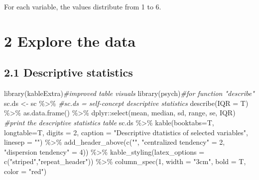 \documentclass[
]{article}
\newenvironment{Shaded}{\begin{snugshade}}{\end{snugshade}}
\newcommand{\AttributeTok}[1]{\textcolor[rgb]{0.77,0.63,0.00}{#1}}
\newcommand{\CommentTok}[1]{\textcolor[rgb]{0.56,0.35,0.01}{\textit{#1}}}
\newcommand{\DecValTok}[1]{\textcolor[rgb]{0.00,0.00,0.81}{#1}}
\newcommand{\FunctionTok}[1]{\textcolor[rgb]{0.00,0.00,0.00}{#1}}
\newcommand{\NormalTok}[1]{#1}
\newcommand{\OtherTok}[1]{\textcolor[rgb]{0.56,0.35,0.01}{#1}}
\newcommand{\SpecialCharTok}[1]{\textcolor[rgb]{0.00,0.00,0.00}{#1}}
\newcommand{\StringTok}[1]{\textcolor[rgb]{0.31,0.60,0.02}{#1}}
\begin{document}
For each variable, the values distribute from 1 to 6.

\hypertarget{explore-the-data}{%
\section{2 Explore the data}\label{explore-the-data}}

\hypertarget{descriptive-statistics}{%
\subsection{2.1 Descriptive statistics}\label{descriptive-statistics}}

\begin{Shaded}
\begin{Highlighting}[]
\FunctionTok{library}\NormalTok{(kableExtra)}\CommentTok{\#improved table visuals}
\FunctionTok{library}\NormalTok{(psych)}\CommentTok{\#for function "describe"}
\NormalTok{sc.ds }\OtherTok{\textless{}{-}}\NormalTok{ sc }\SpecialCharTok{\%\textgreater{}\%}  \CommentTok{\#sc.ds = self{-}concept descriptive statistics}
  \FunctionTok{describe}\NormalTok{(}\AttributeTok{IQR =}\NormalTok{ T) }\SpecialCharTok{\%\textgreater{}\%}
  \FunctionTok{as.data.frame}\NormalTok{() }\SpecialCharTok{\%\textgreater{}\%} 
\NormalTok{  dplyr}\SpecialCharTok{::}\FunctionTok{select}\NormalTok{(mean, median, sd, range, se, IQR)}
\CommentTok{\#print the descriptive statistics table}
\NormalTok{sc.ds }\SpecialCharTok{\%\textgreater{}\%} 
  \FunctionTok{kable}\NormalTok{(}\AttributeTok{booktabs=}\NormalTok{T,}
        \AttributeTok{longtable=}\NormalTok{T,}
        \AttributeTok{digits =} \DecValTok{2}\NormalTok{,}
        \AttributeTok{caption =} \StringTok{"Descriptive dtatistics of selected variables"}\NormalTok{,}
        \AttributeTok{linesep =} \StringTok{""}\NormalTok{) }\SpecialCharTok{\%\textgreater{}\%} 
  \FunctionTok{add\_header\_above}\NormalTok{(}\FunctionTok{c}\NormalTok{(}\StringTok{""}\NormalTok{, }\StringTok{"centralized tendency"} \OtherTok{=} \DecValTok{2}\NormalTok{, }\StringTok{"dispersion tendency"} \OtherTok{=} \DecValTok{4}\NormalTok{)) }\SpecialCharTok{\%\textgreater{}\%} 
  \FunctionTok{kable\_styling}\NormalTok{(}\AttributeTok{latex\_options =} \FunctionTok{c}\NormalTok{(}\StringTok{"striped"}\NormalTok{,}\StringTok{"repeat\_header"}\NormalTok{)) }\SpecialCharTok{\%\textgreater{}\%} 
  \FunctionTok{column\_spec}\NormalTok{(}\DecValTok{1}\NormalTok{, }\AttributeTok{width =} \StringTok{"3cm"}\NormalTok{, }\AttributeTok{bold =}\NormalTok{ T, }\AttributeTok{color =} \StringTok{"red"}\NormalTok{)}
\end{Highlighting}
\end{Shaded}
\end{document}
